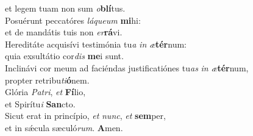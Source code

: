 \oddverse et legem tuam non sum \textit{o}\textbf{blí}tus.\\
\evenverse Posuérunt peccatóres \textit{lá}\textit{que}\textit{um} \textbf{mi}hi:~\*\\
\evenverse et de mandátis tuis non \textit{er}\textbf{rá}vi.\\
\oddverse Hereditáte acquisívi testimónia tu\textit{a} \textit{in} \textit{æ}\textbf{tér}num:~\*\\
\oddverse quia exsultátio cor\textit{dis} \textbf{me}i sunt.\\
\evenverse Inclinávi cor meum ad faciéndas justificatiónes tu\textit{as} \textit{in} \textit{æ}\textbf{tér}num,~\*\\
\evenverse propter retribu\textit{ti}\textbf{ó}nem.\\
\oddverse Glória \textit{Pa}\textit{tri}, \textit{et} \textbf{Fí}lio,~\*\\
\oddverse et Spirítu\textit{i} \textbf{San}cto.\\
\evenverse Sicut erat in princípio, \textit{et} \textit{nunc}, \textit{et} \textbf{sem}per,~\*\\
\evenverse et in sǽcula sæculó\textit{rum}. \textbf{A}men.\\
